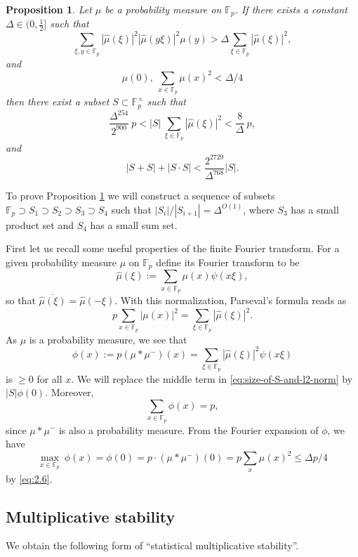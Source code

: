 \documentclass[11pt]{amsart}
\newtheorem{prop}[thm]{Proposition}
\newcommand{\fp}{\mathbb{F}_p}
\newcommand{\muhat}{{\widehat{\mu}}}
\begin{document}
\begin{prop}
\label{p:proposition2.1} Let $\mu$ be a probability measure on
$\fp$. If there exists a constant $\Delta\in (0, \frac 12]$ such
that
\begin{equation}
  \label{eq:2.5}
\sum_{\xi, y \in \fp} |\muhat(\xi)|^2 |\muhat(y\xi)|^2 \mu(y)
>
\Delta \sum_{\xi \in \fp}  |\muhat(\xi)|^2,
\end{equation}
and
\begin{equation}
  \label{eq:2.6}
\mu(0),\ \sum_{x \in \fp} \mu(x)^2 < \Delta/4
\end{equation}
then there exist a subset $S \subset \fp^\times$ such that
\begin{equation}
  \label{eq:size-of-S-and-l2-norm}
 \frac{\Delta^{254}}{2^{900}} \ p < |S|\ \sum_{\xi \in \fp}  |\muhat(\xi)|^2 <
  \frac 8 \Delta \ p,
\end{equation}
and
$$
|S+S| + |S \cdot S| <   \frac{2^{2729}}{\Delta^{768}} |S| .
$$
\end{prop}


To prove Proposition \ref{p:proposition2.1}  we will construct a
sequence of subsets $\fp \supset S_1 \supset S_2 \supset S_3 \supset
S_4$ such that $|S_i|/|S_{i+1}|=\Delta^{O(1)}$, where $S_3$ has a
small product set and $S_4$ has a small sum set.

First let us  recall some useful properties of
the finite Fourier transform.  For a given probability measure $\mu$
on $\fp$ define its Fourier 
transform to be
$$
\muhat(\xi) := \sum_{x \in \fp} \mu(x) \psi(x \xi) ,
$$
so that $\overline{\muhat(\xi)}=\muhat(-\xi)$. With this
normalization, Parseval's formula reads as
$$
p \sum_{x \in \fp} |\mu(x)|^2 =  \sum_{\xi \in \fp} |\muhat(\xi)|^2.
$$
%
As $\mu$ is a probability measure, we see that
$$
\phi(x) := p (\mu \ast \mu^-)(x) = \sum_{\xi \in \fp}
|\muhat(\xi)|^2 \psi(x \xi)
$$
is  $\geq 0$ for all $x$. We will replace the middle term in
\eqref{eq:size-of-S-and-l2-norm} by $|S|\phi(0)$. Moreover,
$$
\sum_{x \in \fp} \phi(x) = p,
$$
since $\mu \ast \mu^-$ is also a probability measure. From the
Fourier expansion of $\phi$, we have
\begin{equation}
\label{eq:phi-zero-bound} \max_{x \in \fp}\ \phi(x) =\phi(0) = p
\cdot (\mu \ast \mu^-)(0) = p \sum_x \mu(x)^2 \leq  \Delta p /4
\end{equation}
by \eqref{eq:2.6}.



\subsection{Multiplicative stability} We obtain the
following form of ``statistical multiplicative stability''.
\end{document}
